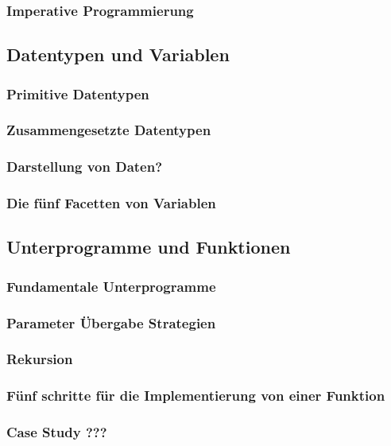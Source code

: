 \subsubsection{Imperative Programmierung}

\subsection{Datentypen und Variablen}

\subsubsection{Primitive Datentypen}

\subsubsection{Zusammengesetzte Datentypen}

\subsubsection{Darstellung von Daten?}

\subsubsection{Die fünf Facetten von Variablen}

\subsection{Unterprogramme und Funktionen}

\subsubsection{Fundamentale Unterprogramme}

\subsubsection{Parameter Übergabe Strategien}

\subsubsection{Rekursion}

\subsubsection{Fünf schritte für die Implementierung von einer Funktion}

\subsubsection{Case Study ???}
